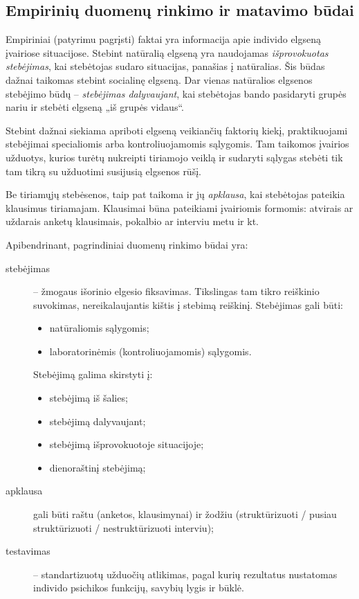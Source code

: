 \label{tema:psichologijos_metodai}

\subsection{Empirinių duomenų rinkimo ir matavimo būdai}

Empiriniai (patyrimu pagrįsti) faktai yra informacija apie individo elgseną
įvairiose situacijose. Stebint natūralią elgseną yra naudojamas 
\emph{išprovokuotas stebėjimas}, kai stebėtojas sudaro situacijas, panašias 
į natūralias. Šis būdas dažnai taikomas stebint socialinę elgseną. Dar 
vienas natūralios elgsenos stebėjimo būdų – \emph{stebėjimas dalyvaujant}, 
kai stebėtojas bando pasidaryti grupės nariu ir stebėti elgseną „iš grupės 
vidaus“.

Stebint dažnai siekiama apriboti elgseną veikiančių faktorių kiekį, 
praktikuojami stebėjimai specialiomis arba kontroliuojamomis sąlygomis. 
Tam taikomos įvairios užduotys, kurios turėtų nukreipti tiriamojo veiklą 
ir sudaryti sąlygas stebėti tik tam tikrą su užduotimi susijusią elgsenos 
rūšį.

Be tiriamųjų stebėsenos, taip pat taikoma ir jų \emph{apklausa}, kai 
stebėtojas pateikia klausimus tiriamajam. Klausimai būna pateikiami 
įvairiomis formomis: atvirais ar uždarais anketų klausimais, pokalbio ar 
interviu metu ir kt.

Apibendrinant, pagrindiniai duomenų rinkimo būdai yra:
\begin{description}
  \item[stebėjimas] – žmogaus išorinio elgesio fiksavimas. Tikslingas tam
    tikro reiškinio suvokimas, nereikalaujantis kištis į stebimą
    reiškinį. Stebėjimas gali būti:
    \begin{itemize}
      \item natūraliomis sąlygomis;
      \item laboratorinėmis (kontroliuojamomis) sąlygomis.
    \end{itemize}
    Stebėjimą galima skirstyti į:
    \begin{itemize}
      \item stebėjimą iš šalies;
      \item stebėjimą dalyvaujant;
      \item stebėjimą išprovokuotoje situacijoje;
      \item dienoraštinį stebėjimą;
    \end{itemize}
  \item[apklausa] gali būti raštu (anketos, klausimynai) ir
    žodžiu (struktūrizuoti / pusiau struktūrizuoti / nestruktūrizuoti
    interviu);
  \item[testavimas] – standartizuotų užduočių atlikimas, pagal kurių
    rezultatus nustatomas individo psichikos funkcijų, savybių lygis ir
    būklė.
\end{description}

